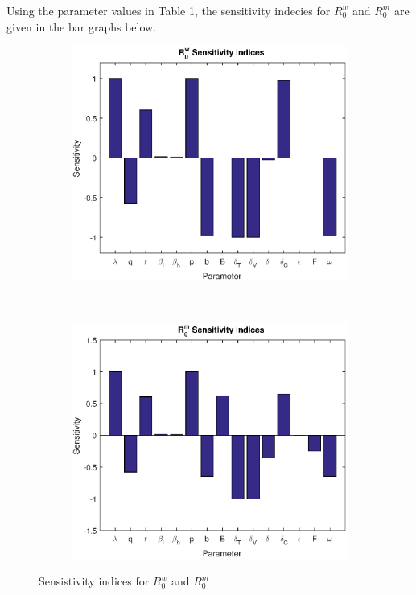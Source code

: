\documentclass[11pt, oneside]{article}    %
\begin{document}
\vspace{5mm}

Using the parameter values in Table 1, the sensitivity indecies for $R_0^w$ and $R_0^m$ are given in the bar graphs below.

\begin{figure}[h]
    \centering
    \begin{subfigure}[b]{0.5\textwidth}
        \centering
        \includegraphics[scale=0.5]{Rw_sen.eps}
    \end{subfigure}%
    ~ 
    \begin{subfigure}[b]{0.5\textwidth}
        \centering
        \includegraphics[scale=0.5]{Rm_sen.eps}
    \end{subfigure}
    \caption{Sensistivity indices for $R_0^w$ and $R_0^m$}
\end{figure}
\end{document}

